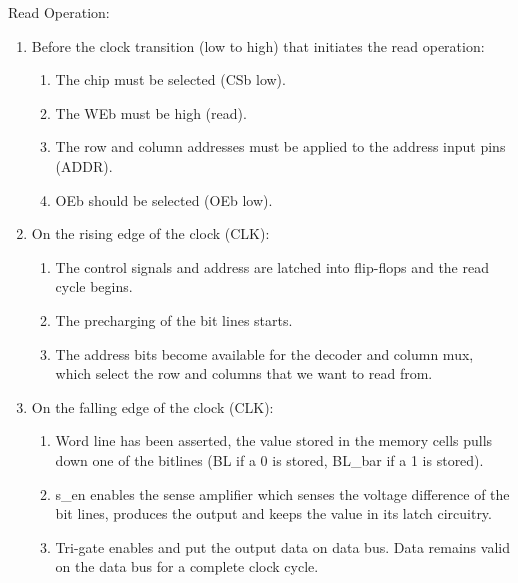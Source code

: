 Read Operation:
\begin{enumerate}
\setlength{\itemsep}{0pt}
 \item Before the clock transition (low to high) that initiates the read operation:
  \begin{enumerate}
	\item The chip must be selected (CSb low).
	\item The WEb must be high (read). 
	\item The row and column addresses must be applied to the address input pins (ADDR).
	\item OEb should be selected (OEb low).
   \end{enumerate}
 \item On the rising edge of the clock (CLK):
   \begin{enumerate}
	\item The control signals and address are latched into flip-flops and the read cycle begins. 
	\item The precharging of the bit lines starts.  
	\item The address bits become available for the decoder and column mux, which select the row and columns that we want to read from.
   \end{enumerate}
 \item On the falling edge of the clock (CLK):
   \begin{enumerate}
        \item Word line has been asserted, the value stored in the memory cells pulls down one of the bitlines (BL if a 0 is stored, BL\_bar if a 1 is stored).
	\item s\_en enables the sense amplifier which senses the voltage difference of the bit lines, produces the output and keeps the value in its latch circuitry.
	\item Tri-gate enables and put the output data on data bus. Data remains valid on the data bus for a complete clock cycle.
   \end{enumerate}
\end{enumerate}


